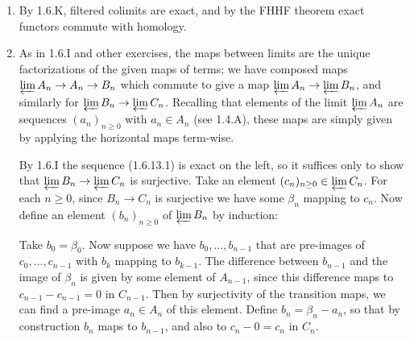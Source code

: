 \documentclass{report}
\newcommand{\limit}{\varprojlim} %
\begin{document}
\begin{enumerate}[label=\textbf{1.6.\Alph*.}]
	\item By 1.6.K, filtered colimits are exact, and by the FHHF theorem exact
	      functors commute with homology.

	\item As in 1.6.I and other exercises, the maps between limits are the
	      unique factorizations of the given maps of terms; we have composed
	      maps $\limit A_n\to A_n\to B_n$ which commute to give a map
	      $\limit A_n\to\limit B_n$, and similarly for
	      $\limit B_n\to\limit C_n$. Recalling that elements of the limit
	      $\limit A_n$ are sequences $(a_n)_{n\ge0}$ with $a_n\in A_n$ (see
	      1.4.A), these maps are simply given by applying the horizontal maps
	      term-wise.

	      By 1.6.I the sequence (1.6.13.1) is exact on the left, so it suffices
	      only to show that $\limit B_n\to\limit C_n$ is surjective. Take an
	      element $(c_n)_{n\ge0}\in\limit C_n$. For each $n\ge0$, since
	      $B_n\to C_n$ is surjective we have some $\beta_n$ mapping to $c_n$. Now
	      define an element $(b_n)_{n\ge0}$ of $\limit B_n$ by induction:

	      Take $b_0=\beta_0$. Now suppose we have $b_0,\ldots,b_{n-1}$ that are
	      pre-images of $c_0,\ldots,c_{n-1}$ with $b_k$ mapping to $b_{k-1}$.
	      The difference between $b_{n-1}$ and the image of $\beta_n$ is given
	      by some element of $A_{n-1}$, since this difference maps to
	      $c_{n-1}-c_{n-1}=0$ in $C_{n-1}$. Then by surjectivity of the
	      transition maps, we can find a pre-image $a_n\in A_n$ of this element.
	      Define $b_n=\beta_n-a_n$, so that by construction $b_n$ maps to
	      $b_{n-1}$, and also to $c_n-0=c_n$ in $C_n$.
\end{enumerate}
\end{document}
